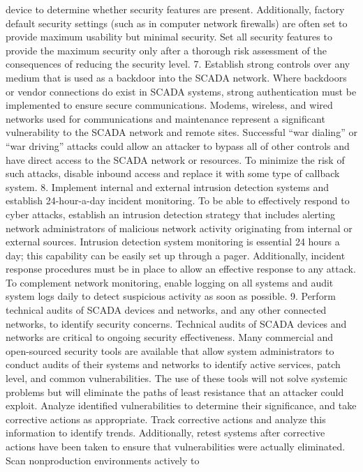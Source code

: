 \documentclass{article}
\begin{document}
device to determine whether security features are present. Additionally,
factory default security settings (such as in computer network
firewalls) are often set to provide maximum usability but minimal
security. Set all security features to provide the maximum security only
after a thorough risk assessment of the consequences of reducing the
security level. 7. Establish strong controls over any medium that is
used as a backdoor into the SCADA network. Where backdoors or vendor
connections do exist in SCADA systems, strong authentication must be
implemented to ensure secure communications. Modems, wireless, and wired
networks used for communications and maintenance represent a significant
vulnerability to the SCADA network and remote sites. Successful ``war
dialing'' or ``war driving'' attacks could allow an attacker to bypass
all of other controls and have direct access to the SCADA network or
resources. To minimize the risk of such attacks, disable inbound access
and replace it with some type of callback system. 8. Implement internal
and external intrusion detection systems and establish 24-hour-a-day
incident monitoring. To be able to effectively respond to cyber attacks,
establish an intrusion detection strategy that includes alerting network
administrators of malicious network activity originating from internal
or external sources. Intrusion detection system monitoring is essential
24 hours a day; this capability can be easily set up through a pager.
Additionally, incident response procedures must be in place to allow an
effective response to any attack. To complement network monitoring,
enable logging on all systems and audit system logs daily to detect
suspicious activity as soon as possible. 9. Perform technical audits of
SCADA devices and networks, and any other connected networks, to
identify security concerns. Technical audits of SCADA devices and
networks are critical to ongoing security effectiveness. Many commercial
and open-sourced security tools are available that allow system
administrators to conduct audits of their systems and networks to
identify active services, patch level, and common vulnerabilities. The
use of these tools will not solve systemic problems but will eliminate
the paths of least resistance that an attacker could exploit. Analyze
identified vulnerabilities to determine their significance, and take
corrective actions as appropriate. Track corrective actions and analyze
this information to identify trends. Additionally, retest systems after
corrective actions have been taken to ensure that vulnerabilities were
actually eliminated. Scan nonproduction environments actively to
\end{document}
